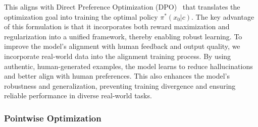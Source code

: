 \normalsize
This aligns with Direct Preference Optimization (DPO)~\cite{rafailov2024directpreferenceoptimizationlanguage} that translates the optimization goal into training the optimal policy \( \pi^*(x_0|c) \). The key advantage of this formulation is that it incorporates both reward maximization and regularization into a unified framework, thereby enabling robust learning.
To improve the model’s alignment with human feedback and output quality, we incorporate real-world data into the alignment training process. By using authentic, human-generated examples, the model learns to reduce hallucinations and better align with human preferences. This also enhances the model's robustness and generalization, preventing training divergence and ensuring reliable performance in diverse real-world tasks.

\subsubsection{Pointwise Optimization}



